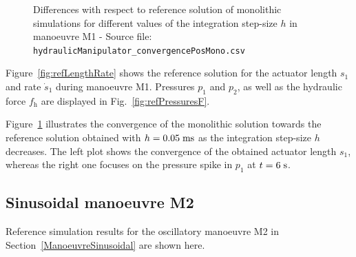 \documentclass[fleqn,11pt]{article}
\newcommand{\unit}[1]		{ {\; \rm #1} }
\begin{document}
\begin{figure}[!ht]
{ 
	}
	\caption{Differences with respect to reference solution of monolithic simulations for different values of the integration step-size $h$ in manoeuvre M1 - Source file: \texttt{hydraulicManipulator\_convergencePosMono.csv}}
	\label{fig:refConvergence}
\end{figure}

Figure~\ref{fig:refLengthRate} shows the reference solution for the actuator length $s_1$ and rate $\dot{s}_1$ during manoeuvre M1.
Pressures $p_1$ and $p_2$, as well as the hydraulic force $f_{\text{h}}$ are displayed in Fig.~\ref{fig:refPressuresF}.

Figure~\ref{fig:refConvergence} illustrates the convergence of the monolithic solution towards the reference solution obtained with $h=0.05\unit{ms}$ as the integration step-size $h$ decreases.
The left plot shows the convergence of the obtained actuator length $s_1$, whereas the right one focuses on the pressure spike in $p_1$ at $t=6\unit{s}$.


\subsection{Sinusoidal manoeuvre M2}
\label{ReferenceSolutionM2}

Reference simulation results for the oscillatory manoeuvre M2 in Section~\ref{ManoeuvreSinusoidal} are shown here.
\end{document}

